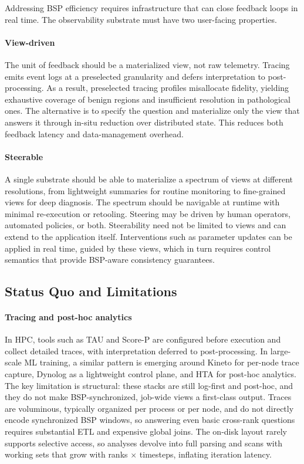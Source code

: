 Addressing BSP efficiency requires infrastructure that can close feedback loops in real time.
The observability substrate must have two user-facing properties.

\paragraph{View-driven}
The unit of feedback should be a materialized view, not raw telemetry.
Tracing emits event logs at a preselected granularity and defers interpretation to post-processing.
As a result, preselected tracing profiles misallocate fidelity, yielding exhaustive coverage of
benign
regions and insufficient resolution in pathological ones.
The alternative is to specify the question and materialize only the view that answers it through
in-situ reduction over distributed state.
This reduces both feedback latency and data-management overhead.

\paragraph{Steerable}
A single substrate should be able to materialize a spectrum of views at different resolutions, from
lightweight summaries for routine monitoring to fine-grained views for deep diagnosis.
The spectrum should be navigable at runtime with minimal re-execution or retooling.
Steering may be driven by human operators, automated policies, or both.
Steerability need not be limited to views and can extend to the application itself.
Interventions such as parameter updates can be applied in real time, guided by these views, which
in turn requires control semantics that provide BSP-aware consistency guarantees.


\subsection{Status Quo and Limitations}

\paragraph{Tracing and post-hoc analytics}
In HPC, tools such as TAU and Score-P are configured before execution and collect detailed traces,
with interpretation deferred to post-processing.
In large-scale ML training, a similar pattern is emerging around Kineto for per-node trace capture,
Dynolog as a lightweight control plane, and HTA for post-hoc analytics.
The key limitation is structural: these stacks are still log-first and post-hoc, and they do not
make BSP-synchronized, job-wide views a first-class output.
Traces are voluminous, typically organized per process or per node, and do not directly encode
synchronized BSP windows, so answering even basic cross-rank questions requires substantial ETL and
expensive global joins.
The on-disk layout rarely supports selective access, so analyses devolve into full parsing and
scans with working sets that grow with ranks $\times$ timesteps, inflating iteration latency.


